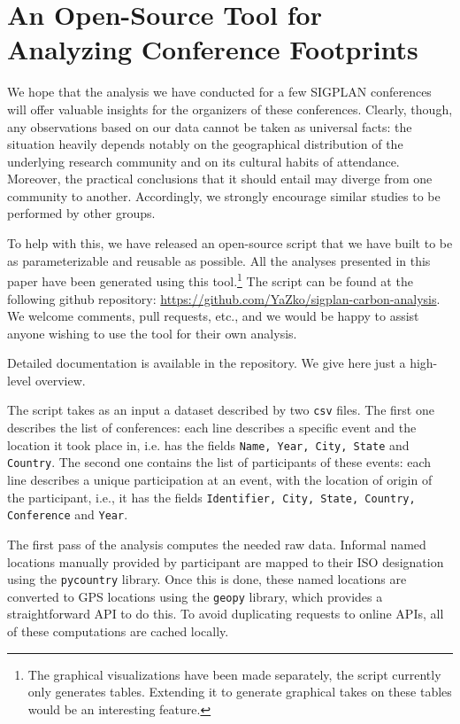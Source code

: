 \section{An Open-Source Tool for Analyzing Conference Footprints}
\label{sec:software}

We hope that the analysis we have conducted for a few SIGPLAN conferences
will offer valuable insights for the organizers of these conferences.
Clearly, though, any observations based on our data cannot be taken as
universal facts: the situation heavily depends notably on the geographical
distribution of the underlying research community and on its cultural habits
of attendance. Moreover, the practical conclusions that it should entail may
diverge from one community to another.  Accordingly, we strongly encourage
similar studies to be performed by other groups.

To help with this, we have released an open-source \python{} script that we
have built to be as parameterizable and reusable as possible. All the
analyses presented in this paper have been generated using this
tool.\footnote{The graphical visualizations have been made separately, the
  script currently only generates tables. Extending it to generate graphical
  takes on these tables would be an interesting feature.} The script can be
found at the following github repository:
\url{https://github.com/YaZko/sigplan-carbon-analysis}.
%
We welcome comments, pull requests, etc., and we would be happy to assist
anyone wishing to use the tool for their own analysis.

Detailed documentation is available in the repository. We give here just a
high-level overview.

The script takes as an input a dataset described by two \texttt{csv}
files. The first one describes the list of conferences: each line describes
a specific event and the location it took place in, i.e. has the fields
\texttt{Name, Year, City, State} and \texttt{Country}. The second one
contains the list of participants of these events: each line describes a
unique participation at an event, with the location of origin of the
participant, i.e., it  has the fields \texttt{Identifier, City, State, Country,
  Conference} and \texttt{Year}.

The first pass of the analysis computes the needed raw data.  Informal named
locations manually provided by participant are mapped to their ISO
designation using the \texttt{pycountry} library.  Once this is done, these
named locations are converted to GPS locations using the \texttt{geopy}
library, which provides a straightforward API to do this.  To avoid
duplicating requests to online APIs, all of these computations are cached
locally.

